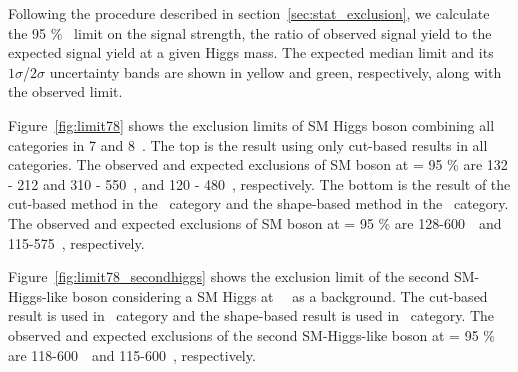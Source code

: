 Following the procedure described in section~\ref{sec:stat_exclusion}, 
we calculate the 95 \% \CLs\ limit on the signal strength, 
the ratio of observed signal yield to the expected signal yield 
at a given Higgs mass. The expected median limit and its $1\sigma$/$2\sigma$ uncertainty
bands are shown in yellow and green, respectively, along with the observed limit. 

Figure~\ref{fig:limit78} shows the exclusion limits of SM Higgs boson combining 
all categories in 7 and 8~\TeV. 
The top is the result using only cut-based results in all categories. 
The observed and expected exclusions of SM boson at \CLs = 95 \% are 
132 - 212 and 310 - 550~\GeV, and 120 - 480~\GeV, respectively. 
The bottom is the result of the cut-based method in the \SF\ category 
and the shape-based method in the \DF\ category.
The observed and expected exclusions of SM boson at \CLs = 95 \% are 
128-600~\GeV\ and 115-575~\GeV, respectively. 

Figure~\ref{fig:limit78_secondhiggs} shows the exclusion limit of 
the second SM-Higgs-like boson considering a SM Higgs at ~\GeV\ as a background.
The cut-based result is used in \SF\ category 
and the shape-based result is used in \DF\ category.
The observed and expected exclusions of the second SM-Higgs-like boson at \CLs = 95 \% 
are 118-600~\GeV\ and 115-600~\GeV, respectively. 

